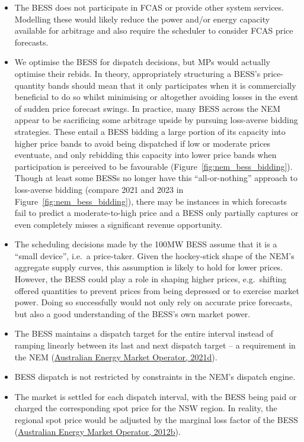 \documentclass[12pt,a4paper,]{report}
\providecommand{\tightlist}{%
  \setlength{\itemsep}{0pt}\setlength{\parskip}{0pt}}
\begin{document}
\begin{itemize}
\tightlist
\item
  The BESS does not participate in FCAS or provide other system
  services. Modelling these would likely reduce the power and/or energy
  capacity available for arbitrage and also require the scheduler to
  consider FCAS price forecasts.
\item
  We optimise the BESS for dispatch decisions, but MPs would actually
  optimise their rebids. In theory, appropriately structuring a BESS's
  price-quantity bands should mean that it only participates when it is
  commercially beneficial to do so whilst minimising or altogether
  avoiding losses in the event of sudden price forecast swings. In
  practice, many BESS across the NEM appear to be sacrificing some
  arbitrage upside by pursuing loss-averse bidding strategies. These
  entail a BESS bidding a large portion of its capacity into higher
  price bands to avoid being dispatched if low or moderate prices
  eventuate, and only rebidding this capacity into lower price bands
  when participation is perceived to be favourable
  (Figure~\ref{fig:nem_bess_bidding}). Though at least some BESSs no
  longer have this ``all-or-nothing'' approach to loss-averse bidding
  (compare 2021 and 2023 in Figure~\ref{fig:nem_bess_bidding}), there
  may be instances in which forecasts fail to predict a moderate-to-high
  price and a BESS only partially captures or even completely misses a
  significant revenue opportunity.
\item
  The scheduling decisions made by the 100MW BESS assume that it is a
  ``small device'', i.e.~a price-taker. Given the hockey-stick shape of
  the NEM's aggregate supply curves, this assumption is likely to hold
  for lower prices. However, the BESS could play a role in shaping
  higher prices, e.g.~shifting offered quantities to prevent prices from
  being depressed or to exercise market power. Doing so successfully
  would not only rely on accurate price forecasts, but also a good
  understanding of the BESS's own market power.
\item
  The BESS maintains a dispatch target for the entire interval instead
  of ramping linearly between its last and next dispatch target -- a
  requirement in the NEM
  (\protect\hyperlink{ref-australianenergymarketoperatorDispatchStandardOperating2019}{Australian
  Energy Market Operator, 2021d}).
\item
  BESS dispatch is not restricted by constraints in the NEM's dispatch
  engine.
\item
  The market is settled for each dispatch interval, with the BESS being
  paid or charged the corresponding spot price for the NSW region. In
  reality, the regional spot price would be adjusted by the marginal
  loss factor of the BESS
  (\protect\hyperlink{ref-aemoTreatmentLossFactors2012}{Australian
  Energy Market Operator, 2012b}).
\end{itemize}
\end{document}
